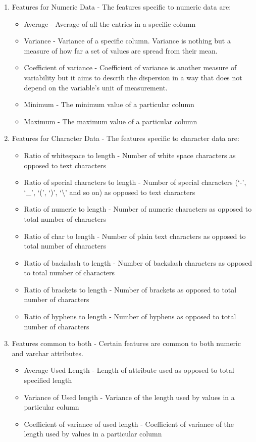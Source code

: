 \documentclass[conference]{IEEEtran}
\begin{document}
\begin{enumerate}
\item Features for Numeric Data - The features specific to numeric data are:
\begin{itemize}[leftmargin=*]
\item Average - Average of all the entries in a specific column
\item Variance - Variance of a specific column. Variance is nothing but a measure of how far a set of values are spread from their mean.
\item Coefficient of variance - Coefficient of variance is another measure of variability but it aims to describ the dispersion in a way that does not depend on the variable's unit of measurement.
\item Minimum - The minimum value of a particular column
\item Maximum - The maximum value of a particular column
\end{itemize}
\item Features for Character Data - The features specific to character data are:
\begin{itemize}
\item Ratio of whitespace to length - Number of white space characters as opposed to text characters
\item Ratio of special characters to length - Number of special characters (`-', `\_', `(', `)', `$\setminus$' and so on) as opposed to text characters
\item Ratio of numeric to length - Number of numeric characters as opposed to total number of characters
\item Ratio of char to length - Number of plain text characters as opposed to total number of characters
\item Ratio of backslash to length - Number of backslash characters as opposed to total number of characters
\item Ratio of brackets to length - Number of brackets as opposed to total number of characters
\item Ratio of hyphens to length -  Number of hyphens as opposed to total number of characters
\end{itemize}
\item Features common to both - Certain features are common to both numeric and varchar attributes.
\begin{itemize}
\item Average Used Length - Length of attribute used as opposed to total specified length
\item Variance of Used length - Variance of the length used by values in a particular column
\item Coefficient of variance of used length - Coefficient of variance of the length used by values in a particular column 
\end{itemize} 
\end{enumerate}
\end{document}

